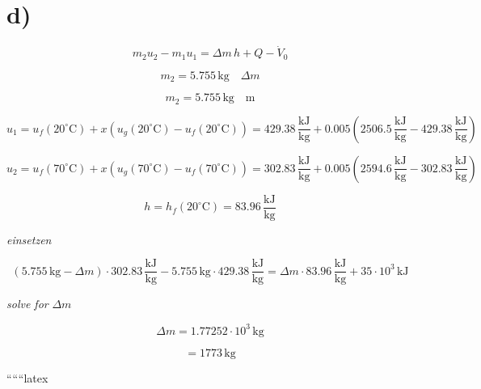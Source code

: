 

\section*{d)}

\[
m_2 u_2 - m_1 u_1 = \Delta m \, h + Q - \dot{V}_0
\]

\[
m_2 = 5.755 \, \text{kg} \quad \Delta m
\]

\[
m_2 = 5.755 \, \text{kg} \quad \text{m}
\]

\[
u_1 = u_f (20^\circ \text{C}) + x (u_g (20^\circ \text{C}) - u_f (20^\circ \text{C})) = 429.38 \, \frac{\text{kJ}}{\text{kg}} + 0.005 (2506.5 \, \frac{\text{kJ}}{\text{kg}} - 429.38 \, \frac{\text{kJ}}{\text{kg}})
\]

\[
u_2 = u_f (70^\circ \text{C}) + x (u_g (70^\circ \text{C}) - u_f (70^\circ \text{C})) = 302.83 \, \frac{\text{kJ}}{\text{kg}} + 0.005 (2594.6 \, \frac{\text{kJ}}{\text{kg}} - 302.83 \, \frac{\text{kJ}}{\text{kg}})
\]

\[
h = h_f (20^\circ \text{C}) = 83.96 \, \frac{\text{kJ}}{\text{kg}}
\]

\textit{einsetzen}

\[
(5.755 \, \text{kg} - \Delta m) \cdot 302.83 \, \frac{\text{kJ}}{\text{kg}} - 5.755 \, \text{kg} \cdot 429.38 \, \frac{\text{kJ}}{\text{kg}} = \Delta m \cdot 83.96 \, \frac{\text{kJ}}{\text{kg}} + 35 \cdot 10^3 \, \text{kJ}
\]

\textit{solve for} \(\Delta m\)

\[
\Delta m = 1.77252 \cdot 10^3 \, \text{kg}
\]

\[
= 1773 \, \text{kg}
\]

``````latex